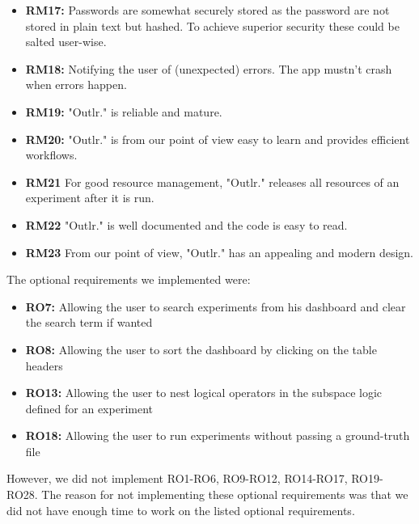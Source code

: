 \begin{itemize}
    \item \textbf{RM17:} Passwords are somewhat securely stored as the password are not stored in plain text but hashed. To achieve superior security these could be salted user-wise.
    \item \textbf{RM18:} Notifying the user of (unexpected) errors. The app mustn't crash when errors happen.
    \item \textbf{RM19:} "Outlr." is reliable and mature.
    \item \textbf{RM20:} "Outlr." is from our point of view easy to learn and provides efficient workflows.
    \item \textbf{RM21} For good resource management, "Outlr." releases all resources of an experiment after it is run.
    \item \textbf{RM22} "Outlr." is well documented and the code is easy to read.
    \item \textbf{RM23} From our point of view, "Outlr." has an appealing and modern design.
\end{itemize}
The optional requirements we implemented were:
\begin{itemize}
    \item \textbf{RO7:} Allowing the user to search experiments from his dashboard and clear the search term if wanted 
    \item \textbf{RO8:} Allowing the user to sort the dashboard by clicking on the table headers
    \item \textbf{RO13:} Allowing the user to nest logical operators in the subspace logic defined for an experiment
    \item \textbf{RO18:} Allowing the user to run experiments without passing a ground-truth file
\end{itemize}
However, we did not implement RO1-RO6, RO9-RO12, RO14-RO17, RO19-RO28. The reason for not implementing these optional requirements was that we did not have enough time to work on the listed optional requirements.


\newpage